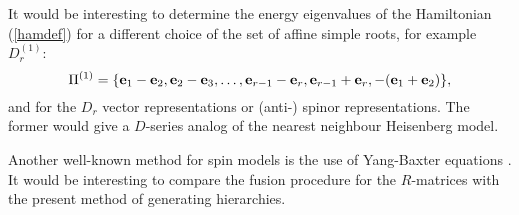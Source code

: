 \documentclass[a4paper,12pt]{article}
\begin{document}
It would be interesting to determine the energy eigenvalues of the
Hamiltonian
(\ref{hamdef}) for a different choice of the set
of affine simple roots, for example
$D_r^{(1)}$:
\begin{equation}
\Pi^{(1)}=\{{\bf e}_1-{\bf e}_2,{\bf e}_2-{\bf e}_3,\ldots,
{\bf e}_{r-1}-{\bf e}_{r}, {\bf e}_{r-1}+{\bf
e}_{r},-({\bf e}_{1}+{\bf e}_2)\},
\label{drafroots}
\end{equation}
and for the $D_r$ vector representations or (anti-) spinor representations.
The former would give a $D$-series analog of
the nearest neighbour Heisenberg model.

Another well-known method for spin models is the use of Yang-Baxter
equations
\cite{kulskl}. It would be interesting to compare the fusion procedure for
the
$R$-matrices with the present method of generating hierarchies.
\end{document}
